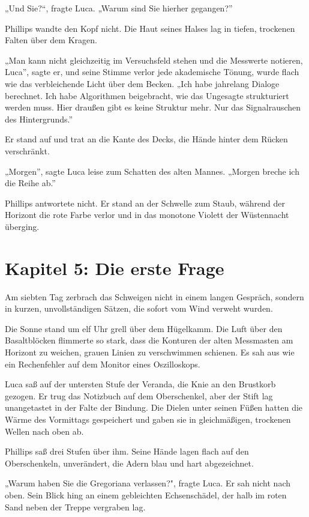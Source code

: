 \documentclass[
  ngerman,
]{article}
\begin{document}
„Und Sie?``, fragte Luca. „Warum sind Sie hierher gegangen?''

Phillips wandte den Kopf nicht. Die Haut seines Halses lag in tiefen,
trockenen Falten über dem Kragen.

„Man kann nicht gleichzeitig im Versuchsfeld stehen und die Messwerte
notieren, Luca'', sagte er, und seine Stimme verlor jede akademische
Tönung, wurde flach wie das verbleichende Licht über dem Becken. „Ich
habe jahrelang Dialoge berechnet. Ich habe Algorithmen beigebracht, wie
das Ungesagte strukturiert werden muss. Hier draußen gibt es keine
Struktur mehr. Nur das Signalrauschen des Hintergrunds.''

Er stand auf und trat an die Kante des Decks, die Hände hinter dem
Rücken verschränkt.

„Morgen'', sagte Luca leise zum Schatten des alten Mannes. „Morgen
breche ich die Reihe ab.''

Phillips antwortete nicht. Er stand an der Schwelle zum Staub, während
der Horizont die rote Farbe verlor und in das monotone Violett der
Wüstennacht überging.

\section{Kapitel 5: Die erste Frage}\label{kapitel-5-die-erste-frage}

Am siebten Tag zerbrach das Schweigen nicht in einem langen Gespräch,
sondern in kurzen, unvollständigen Sätzen, die sofort vom Wind verweht
wurden.

Die Sonne stand um elf Uhr grell über dem Hügelkamm. Die Luft über den
Basaltblöcken flimmerte so stark, dass die Konturen der alten Messmasten
am Horizont zu weichen, grauen Linien zu verschwimmen schienen. Es sah
aus wie ein Rechenfehler auf dem Monitor eines Oszilloskops.

Luca saß auf der untersten Stufe der Veranda, die Knie an den Brustkorb
gezogen. Er trug das Notizbuch auf dem Oberschenkel, aber der Stift lag
unangetastet in der Falte der Bindung. Die Dielen unter seinen Füßen
hatten die Wärme des Vormittags gespeichert und gaben sie in
gleichmäßigen, trockenen Wellen nach oben ab.

Phillips saß drei Stufen über ihm. Seine Hände lagen flach auf den
Oberschenkeln, unverändert, die Adern blau und hart abgezeichnet.

„Warum haben Sie die Gregoriana verlassen?", fragte Luca. Er sah nicht
nach oben. Sein Blick hing an einem gebleichten Echsenschädel, der halb
im roten Sand neben der Treppe vergraben lag.
\end{document}
